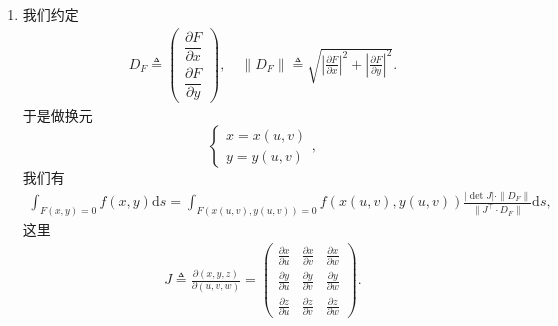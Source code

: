 \documentclass[../../main.tex]{subfiles}%
\begin{document}
\begin{theorem}\label{theorem:第一类曲线曲面积分换元法}
\begin{enumerate}[(1)]
\item 我们约定
\begin{align*}
D_F \triangleq \begin{pmatrix} \dfrac{\partial F}{\partial x}\\[4pt] \dfrac{\partial F}{\partial y} \end{pmatrix},\quad \|D_F\| \triangleq \sqrt{\left|\frac{\partial F}{\partial x}\right|^2+\left|\frac{\partial F}{\partial y}\right|^2}.
\end{align*}
于是做换元
\[
\begin{cases}
x=x(u,v)\\
y=y(u,v)
\end{cases},
\]
我们有
\begin{align*}
\int_{F(x,y)=0} f(x,y)\mathrm{d}s
=\int_{F(x(u,v),y(u,v))=0} f(x(u,v),y(u,v))\frac{|\det J|\cdot\|D_F\|}{\|J^\top\cdot D_F\|}\mathrm{d}s,
\end{align*}
这里
\begin{align*}
J \triangleq \frac{\partial(x,y,z)}{\partial(u,v,w)} = \begin{pmatrix}\frac{\partial x}{\partial u}&\frac{\partial x}{\partial v}&\frac{\partial x}{\partial w}\\\frac{\partial y}{\partial u}&\frac{\partial y}{\partial v}&\frac{\partial y}{\partial w}\\\frac{\partial z}{\partial u}&\frac{\partial z}{\partial v}&\frac{\partial z}{\partial w}\end{pmatrix}.
\end{align*}


\end{enumerate}
\end{theorem}
\end{document}
